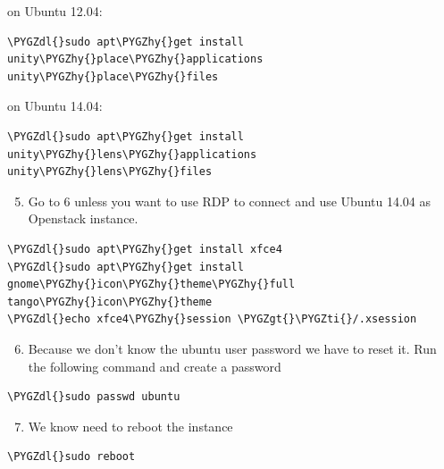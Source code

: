 \documentclass[letterpaper,10pt,english]{sphinxmanual}
\def\PYGZgt{\char`\>}
\def\PYGZdl{\char`\$}
\def\PYGZhy{\char`\-}
\def\PYGZti{\char`\~}
\begin{document}
on Ubuntu 12.04:

\begin{Verbatim}[commandchars=\\\{\}]
\PYGZdl{}sudo apt\PYGZhy{}get install unity\PYGZhy{}place\PYGZhy{}applications unity\PYGZhy{}place\PYGZhy{}files
\end{Verbatim}

on Ubuntu 14.04:

\begin{Verbatim}[commandchars=\\\{\}]
\PYGZdl{}sudo apt\PYGZhy{}get install unity\PYGZhy{}lens\PYGZhy{}applications unity\PYGZhy{}lens\PYGZhy{}files
\end{Verbatim}
\begin{enumerate}
\setcounter{enumi}{4}
\item {} 
Go to 6 unless you want to use RDP to connect and use Ubuntu 14.04 as Openstack instance.

\end{enumerate}

\begin{Verbatim}[commandchars=\\\{\}]
\PYGZdl{}sudo apt\PYGZhy{}get install xfce4
\PYGZdl{}sudo apt\PYGZhy{}get install gnome\PYGZhy{}icon\PYGZhy{}theme\PYGZhy{}full tango\PYGZhy{}icon\PYGZhy{}theme
\PYGZdl{}echo xfce4\PYGZhy{}session \PYGZgt{}\PYGZti{}/.xsession
\end{Verbatim}
\begin{enumerate}
\setcounter{enumi}{5}
\item {} 
Because we don't know the ubuntu user password we have to reset it. Run the following command and create a password

\end{enumerate}

\begin{Verbatim}[commandchars=\\\{\}]
\PYGZdl{}sudo passwd ubuntu
\end{Verbatim}
\begin{enumerate}
\setcounter{enumi}{6}
\item {} 
We know need to reboot the instance

\end{enumerate}

\begin{Verbatim}[commandchars=\\\{\}]
\PYGZdl{}sudo reboot
\end{Verbatim}
\end{document}
